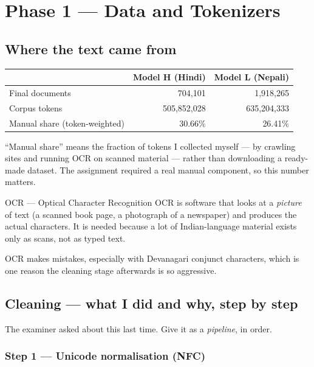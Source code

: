 \documentclass[11pt]{report}
\begin{document}
\chapter{Phase 1 --- Data and Tokenizers}

\section{Where the text came from}

\begin{center}
\begin{tabular}{@{}lrr@{}}
\toprule
 & \textbf{Model H (Hindi)} & \textbf{Model L (Nepali)} \\
\midrule
Final documents & 704,101 & 1,918,265 \\
Corpus tokens & 505,852,028 & 635,204,333 \\
Manual share (token-weighted) & 30.66\% & 26.41\% \\
\bottomrule
\end{tabular}
\end{center}

``Manual share'' means the fraction of tokens I collected myself --- by
crawling sites and running OCR on scanned material --- rather than downloading
a ready-made dataset. The assignment required a real manual component, so this
number matters.

\begin{concept}{OCR --- Optical Character Recognition}
OCR is software that looks at a \emph{picture} of text (a scanned book page, a
photograph of a newspaper) and produces the actual characters. It is needed
because a lot of Indian-language material exists only as scans, not as typed
text.

OCR makes mistakes, especially with Devanagari conjunct characters, which is
one reason the cleaning stage afterwards is so aggressive.
\end{concept}

\section{Cleaning --- what I did and why, step by step}

The examiner asked about this last time. Give it as a \emph{pipeline}, in order.

\subsection{Step 1 --- Unicode normalisation (NFC)}
\end{document}
